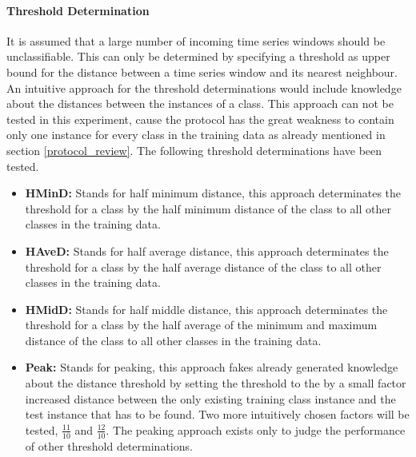 \paragraph{Threshold Determination} \label{threshold_determination}
It is assumed that a large number of incoming time series windows should be unclassifiable. This can only be determined
by specifying a threshold as upper bound for the distance between a time series window and its nearest neighbour. An
intuitive approach for the threshold determinations would include knowledge about the distances between the instances of
a class. This approach can not be tested in this experiment, cause the protocol has the great weakness to contain only
one instance for every class in the training data as already mentioned in section \ref{protocol_review}. The following
threshold determinations have been tested.

\begin{itemize}
    \item \textbf{HMinD:} Stands for half minimum distance, this approach determinates the threshold for a class by the
        half minimum distance of the class to all other classes in the training data.
    \item \textbf{HAveD:} Stands for half average distance, this approach determinates the threshold for a class by the
        half average distance of the class to all other classes in the training data.
    \item \textbf{HMidD:} Stands for half middle distance, this approach determinates the threshold for a class by the
        half average of the minimum and maximum distance of the class to all other classes in the training data.
    \item \textbf{Peak:} Stands for peaking, this approach fakes already generated knowledge about the distance
        threshold by setting the threshold to the by a small factor increased distance between the only existing
        training class instance and the test instance that has to be found. Two more intuitively chosen factors will be
        tested, $\frac{11}{10}$ and $\frac{12}{10}$. The peaking approach exists only to judge the performance of other
        threshold determinations.
\end{itemize}
